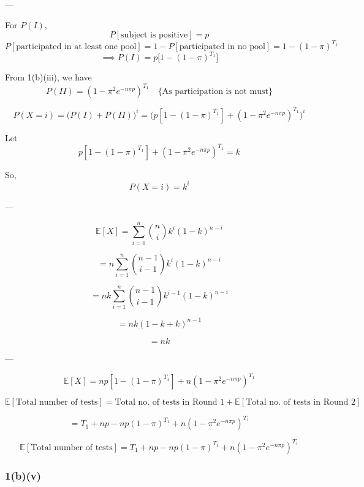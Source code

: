 \documentclass[12pt]{article}
\begin{document}
---

For $P(I)$,  
\[
P[\text{subject is positive}] = p
\]
\[
P[\text{participated in at least one pool}] = 1 - P[\text{participated in no pool}]
= 1 - (1-\pi)^{T_1}
\]
\[
\implies P(I) = p \Big[ 1 - (1-\pi)^{T_1} \Big]
\]

From 1(b)(iii), we have
\[
P(II) = (1 - \pi^2 e^{-n\pi p})^{T_1} 
\quad \Big\{ \text{As participation is not must} \Big\}
\]

\[
P(X = i) = \big(P(I) + P(II)\big)^i
= \Big( p[1-(1-\pi)^{T_1}] + (1-\pi^2 e^{-n\pi p})^{T_1} \Big)^i
\]

Let
\[
p[1-(1-\pi)^{T_1}] + (1-\pi^2 e^{-n\pi p})^{T_1} = k
\]

So,
\[
P(X=i) = k^i
\]

---

\[
\mathbb{E}[X] = \sum_{i=0}^n \binom{n}{i} k^i (1-k)^{n-i}
\]

\[
= n \sum_{i=1}^n \binom{n-1}{i-1} k^i (1-k)^{n-i}
\]

\[
= nk \sum_{i=1}^n \binom{n-1}{i-1} k^{i-1} (1-k)^{n-i}
\]

\[
= nk (1-k+k)^{n-1}
\]

\[
= nk
\]

---

\[
\mathbb{E}[X] = np[1-(1-\pi)^{T_1}] + n(1-\pi^2 e^{-n\pi p})^{T_1}
\]

\[
\mathbb{E}[\text{Total number of tests}] 
= \text{Total no. of tests in Round 1} + \mathbb{E}[\text{Total no. of tests in Round 2}]
\]

\[
= T_1 + np - np(1-\pi)^{T_1} + n(1-\pi^2 e^{-n\pi p})^{T_1}
\]

\[
\boxed{
\mathbb{E}[\text{Total number of tests}]
= T_1 + np - np(1-\pi)^{T_1} + n(1-\pi^2 e^{-n\pi p})^{T_1}
}
\]
\subsubsection{1(b)(v)}
\end{document}
